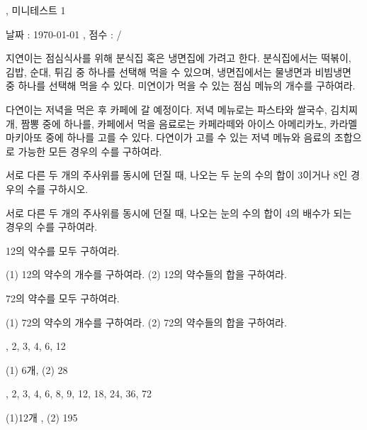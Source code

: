 \documentclass[a4paper]{oblivoir}
\begin{document}
\begin{center}
, 미니테스트 1
\end{center}
\begin{center}
날짜 : \today
,\qquad
점수 :  / 
\end{center}

%
\prob
지연이는 점심식사를 위해 분식집 혹은 냉면집에 가려고 한다.
분식집에서는 떡볶이, 김밥, 순대, 튀김 중 하나를 선택해 먹을 수 있으며, 냉면집에서는 물냉면과 비빔냉면 중 하나를 선택해 먹을 수 있다.
미연이가 먹을 수 있는 점심 메뉴의 개수를 구하여라.
\vs

%
\prob
다연이는 저녁을 먹은 후 카페에 갈 예정이다.
저녁 메뉴로는 파스타와 쌀국수, 김치찌개, 짬뽕 중에 하나를, 카페에서 먹을 음료로는 카페라떼와 아이스 아메리카노, 카라멜 마키아또 중에 하나를 고를 수 있다.
다연이가 고를 수 있는 저녁 메뉴와 음료의 조합으로 가능한 모든 경우의 수를 구하여라.
\vs

%
\prob
서로 다른 두 개의 주사위를 동시에 던질 때, 나오는 두 눈의 수의 합이 3이거나 8인 경우의 수를 구하시오.
\vs

%
\prob
서로 다른 두 개의 주사위를 동시에 던질 때, 나오는 눈의 수의 합이 4의 배수가 되는 경우의 수를 구하여라.
\vs

%
\prob
12의 약수를 모두 구하여라.
\vs

%
\prob
(1) 12의 약수의 개수를 구하여라. (2) 12의 약수들의 합을 구하여라.
\vs

%
\prob
72의 약수를 모두 구하여라.
\vs

%
\prob
(1) 72의 약수의 개수를 구하여라. (2) 72의 약수들의 합을 구하여라.
\vs

\newpage
\setcounter{num}{0}

%

%

%

%

%
, 2, 3, 4, 6, 12

%
\ans
(1) 6개, (2) 28

%
, 2, 3, 4, 6, 8, 9, 12, 18, 24, 36, 72

%
\ans
(1)12개 , (2) 195
\end{document}
